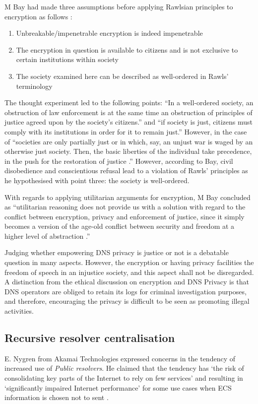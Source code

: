 M Bay had made three assumptions before applying Rawlsian principles to encryption as follows \cite{bay2017ethics}:
\begin{enumerate}
  \item Unbreakable/impenetrable encryption is indeed impenetrable
  \item The encryption in question is available to citizens and is not exclusive to certain institutions within society
  \item The society examined here can be described as well-ordered \cite{moon_2014, RawlsJohn1973Atoj} in Rawls’ terminology
\end{enumerate}
The thought experiment led to the following points: ``In a well-ordered society, an obstruction of law enforcement is at the same time an obstruction of principles of justice agreed upon by the society’s citizens.'' and  ``if society is just, citizens must comply with its institutions in order for it to remain just.''
However, in the case of ``societies are only partially just or in which, say, an unjust war is waged by an otherwise just society. Then, the basic liberties of the individual take precedence, in the push for the restoration of justice \cite{RawlsJohn1973Atoj}.''
However, according to Bay, civil disobedience and conscientious refusal lead to a violation of Rawls’ principles as he hypothesised with point three: the society is well-ordered.

With regards to applying utilitarian arguments for encryption, M Bay concluded as ``utilitarian reasoning does not provide us with a solution with regard to the conflict between encryption, privacy and enforcement of justice, since it simply becomes a version of the age-old conflict between security and freedom at a higher level of abstraction \cite{bay2017ethics}.''

Judging whether empowering DNS privacy is justice or not is a debatable question in many aspects. However, the encryption or having privacy facilities the freedom of speech in an injustice society, and this aspect shall not be disregarded. A distinction from the ethical discussion on encryption and DNS Privacy is that DNS operators are obliged to retain its logs for criminal investigation purposes, and therefore, encouraging the privacy is difficult to be seen as promoting illegal activities. 

\subsection{Recursive resolver centralisation}
E. Nygren from Akamai Technologies expressed concerns in the tendency of increased use of \textit{Public resolvers}.
He claimed that the tendency has `the risk of consolidating key parts of the Internet to rely on few services' and resulting in `significantly impaired Internet performance' for some use cases when ECS information is chosen not to sent \cite{akamai-dns-architecture}.

